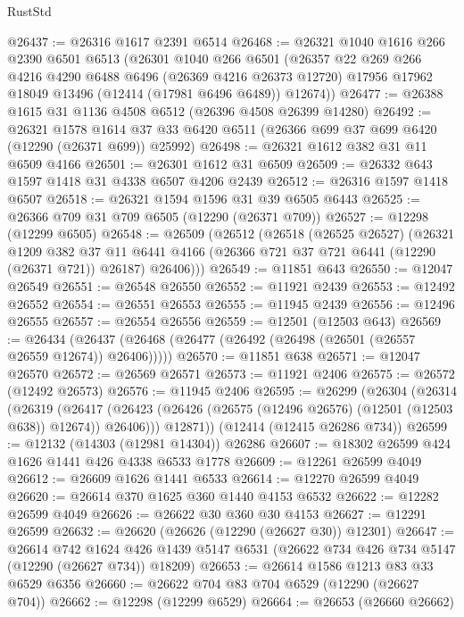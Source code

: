 \begin{lexlean}{RustStd}
\begin{coremodule}
{\begin{coremodule}
{{{{{{{{{{{{{{{{{{{{{{{{{{{{{{{{{{{{{{{{{{{{{{{{{{@26437 := @26316 @1617 @2391 @6514
@26468 := @26321
    @1040
    @1616
    @266
    @2390
    @6501
    @6513
    (@26301
      @1040
      @266
      @6501
      (@26357
        @22
        @269
        @266
        @4216
        @4290
        @6488
        @6496
        (@26369 @4216 @26373 @12720)
        @17956
        @17962
        @18049
        @13496
        (@12414 (@17981 @6496 @6489))
        @12674))
@26477 := @26388 @1615 @31 @1136 @4508 @6512 (@26396 @4508 @26399 @14280)
@26492 := @26321
    @1578
    @1614
    @37
    @33
    @6420
    @6511
    (@26366 @699 @37 @699 @6420 (@12290 (@26371 @699)) @25992)
@26498 := @26321 @1612 @382 @31 @11 @6509 @4166
@26501 := @26301 @1612 @31 @6509
@26509 := @26332 @643 @1597 @1418 @31 @4338 @6507 @4206 @2439
@26512 := @26316 @1597 @1418 @6507
@26518 := @26321 @1594 @1596 @31 @39 @6505 @6443
@26525 := @26366 @709 @31 @709 @6505 (@12290 (@26371 @709))
@26527 := @12298 (@12299 @6505)
@26548 := @26509
    (@26512
      (@26518
        (@26525 @26527)
        (@26321
          @1209
          @382
          @37
          @11
          @6441
          @4166
          (@26366 @721 @37 @721 @6441 (@12290 (@26371 @721)) @26187)
          @26406)))
@26549 := @11851 @643
@26550 := @12047 @26549
@26551 := @26548 @26550
@26552 := @11921 @2439
@26553 := @12492 @26552
@26554 := @26551 @26553
@26555 := @11945 @2439
@26556 := @12496 @26555
@26557 := @26554 @26556
@26559 := @12501 (@12503 @643)
@26569 := @26434 (@26437 (@26468 (@26477 (@26492 (@26498 (@26501 (@26557 @26559 @12674)) @26406)))))
@26570 := @11851 @638
@26571 := @12047 @26570
@26572 := @26569 @26571
@26573 := @11921 @2406
@26575 := @26572 (@12492 @26573)
@26576 := @11945 @2406
@26595 := @26299
    (@26304
      (@26314
        (@26319
          (@26417 (@26423 (@26426 (@26575 (@12496 @26576) (@12501 (@12503 @638)) @12674)) @26406)))
        @12871))
    (@12414 (@12415 @26286 @734))
@26599 := @12132 (@14303 (@12981 @14304)) @26286
@26607 := @18302 @26599 @424 @1626 @1441 @426 @4338 @6533 @1778
@26609 := @12261 @26599 @4049
@26612 := @26609 @1626 @1441 @6533
@26614 := @12270 @26599 @4049
@26620 := @26614 @370 @1625 @360 @1440 @4153 @6532
@26622 := @12282 @26599 @4049
@26626 := @26622 @30 @360 @30 @4153
@26627 := @12291 @26599
@26632 := @26620 (@26626 (@12290 (@26627 @30)) @12301)
@26647 := @26614
    @742
    @1624
    @426
    @1439
    @5147
    @6531
    (@26622 @734 @426 @734 @5147 (@12290 (@26627 @734)) @18209)
@26653 := @26614 @1586 @1213 @83 @33 @6529 @6356
@26660 := @26622 @704 @83 @704 @6529 (@12290 (@26627 @704))
@26662 := @12298 (@12299 @6529)
@26664 := @26653 (@26660 @26662)
}}}}}}}}}}}}}}}}}}}}}}}}}}}}}}}}}}}}}}}}}}}}}}}}}}
\end{coremodule}}
\end{coremodule}
\end{lexlean}
